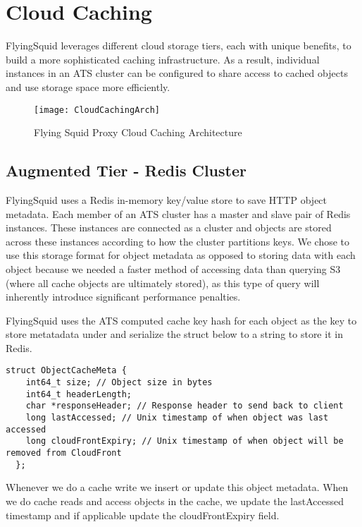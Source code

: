 \section{Cloud Caching}

FlyingSquid leverages different cloud storage tiers, each with unique benefits, to build a more sophisticated caching infrastructure. As a result, individual instances in an ATS cluster can be configured to share access to cached objects and use storage space more efficiently.

\begin{figure}[H] \centering
\texttt{[image: CloudCachingArch]}
\caption{Flying Squid Proxy Cloud Caching Architecture}
\end{figure}

\subsection{Augmented Tier - Redis Cluster}
FlyingSquid uses a Redis in-memory key/value store to save HTTP object metadata. Each member of an ATS cluster has a master and slave pair of Redis instances. These instances are connected as a cluster and objects are stored across these instances according to how the cluster partitions keys. We chose to use this storage format for object metadata as opposed to storing data with each object because we needed a faster method of accessing data than querying S3 (where all cache objects are ultimately stored), as this type of query will inherently introduce significant performance penalties.

\newpage

\noindent
FlyingSquid uses the ATS computed cache key hash for each object as the key to store metatadata under and serialize the struct below to a string to store it in Redis.

\begin{lstlisting}
struct ObjectCacheMeta {
    int64_t size; // Object size in bytes
    int64_t headerLength;
    char *responseHeader; // Response header to send back to client
    long lastAccessed; // Unix timestamp of when object was last accessed
    long cloudFrontExpiry; // Unix timestamp of when object will be removed from CloudFront
  };
\end{lstlisting}

\noindent
Whenever we do a cache write we insert or update this object metadata. When we do cache reads and access objects in the cache, we update the lastAccessed timestamp and if applicable update the cloudFrontExpiry field.

